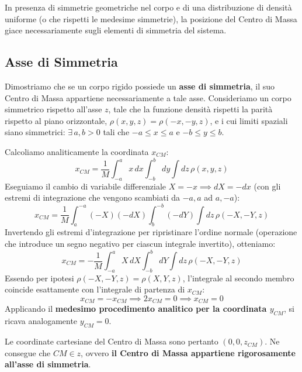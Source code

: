 In presenza di simmetrie geometriche nel corpo e di una distribuzione di densità uniforme (o che rispetti le medesime simmetrie), la posizione del Centro di Massa giace necessariamente sugli elementi di simmetria del sistema.

\subsection{Asse di Simmetria}
Dimostriamo che se un corpo rigido possiede un \textbf{asse di simmetria}, il suo Centro di Massa appartiene necessariamente a tale asse.
Consideriamo un corpo simmetrico rispetto all'asse $z$, tale che la funzione densità rispetti la parità rispetto al piano orizzontale, $\rho(x,y,z) = \rho(-x,-y,z)$, e i cui limiti spaziali siano simmetrici: $\exists \, a, b > 0$ tali che $-a \le x \le a$ e $-b \le y \le b$.

Calcoliamo analiticamente la coordinata $x_{CM}$:
\begin{equation}
    x_{CM} = \frac{1}{M} \int_{-a}^{a} x \, dx \int_{-b}^{b} dy \int dz \, \rho(x,y,z)
\end{equation}
Eseguiamo il cambio di variabile differenziale $X = -x \implies dX = -dx$ (con gli estremi di integrazione che vengono scambiati da $-a, a$ ad $a, -a$):
\begin{equation}
    x_{CM} = \frac{1}{M} \int_{a}^{-a} (-X) (-dX) \int_{b}^{-b} (-dY) \int dz \, \rho(-X,-Y,z)
\end{equation}
Invertendo gli estremi d'integrazione per ripristinare l'ordine normale (operazione che introduce un segno negativo per ciascun integrale invertito), otteniamo:
\begin{equation}
    x_{CM} = - \frac{1}{M} \int_{-a}^{a} X \, dX \int_{-b}^{b} dY \int dz \, \rho(-X,-Y,z)
\end{equation}
Essendo per ipotesi $\rho(-X,-Y,z) = \rho(X,Y,z)$, l'integrale al secondo membro coincide esattamente con l'integrale di partenza di $x_{CM}$:
\begin{equation}
    x_{CM} = - x_{CM} \implies 2x_{CM} = 0 \implies x_{CM} = 0
\end{equation}
Applicando il \textbf{medesimo procedimento analitico per la coordinata $y_{CM}$}, si ricava analogamente $y_{CM} = 0$.

Le coordinate cartesiane del Centro di Massa sono pertanto $(0, 0, z_{CM})$. Ne consegue che $CM \in z$, ovvero \textbf{il Centro di Massa appartiene rigorosamente all'asse di simmetria}.

